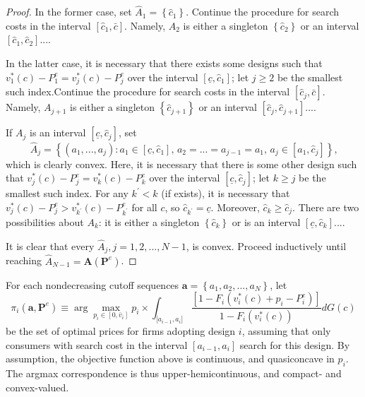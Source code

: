 \documentclass[14pt]{article}
\theoremstyle{plain}
\theoremstyle{definition}
\theoremstyle{remark}
\DeclareRobustCommand\1{\futurelet\oneNext\oneCheck}
\begin{document}
\begin{proof}
In the former case, set $\hat{A}_{1}=\left\{ \hat{c}_{1}\right\} $. Continue
the procedure for search costs in the interval $\left[ \hat{c}_{1},\bar{c}%
\right] $. Namely, $A_{2}$ is either a singleton $\left\{ \hat{c}%
_{2}\right\} $ or an interval $\left[ \hat{c}_{1},\hat{c}_{2}\right] $....

In the latter case, it is necessary that there exists some designs such
that $v_{1}^{\ast }\left( c\right) -P_{1}^{e}=v_{j}^{\ast }\left( c\right)
-P_{j}^{e}$ over the interval $\left[ \underline{c},\hat{c}_{1}\right] $;
let $j\geq 2$ be the smallest such index.Continue the procedure for search costs in the
interval $\left[ \hat{c}_{j},\bar{c}\right] $. Namely, $A_{j+1}$ is either a
singleton $\left\{ \hat{c}_{j+1}\right\} $ or an interval $\left[ \hat{c}%
_{j},\hat{c}_{j+1}\right] $....

If $A_{j}$ is an interval $\left[ \underline{c},\hat{c}_{j}\right] $, set  
\begin{equation*}
\hat{A}_{j}=\left\{ \left( a_{1},...,a_{j}\right) :a_{1}\in \left[ 
\underline{c},\hat{c}_{1}\right] \text{, }a_{2}=...=a_{j-1}=a_{1}\text{, }%
a_{j}\in \left[ a_{1},\hat{c}_{j}\right] \right\} \text{,}
\end{equation*}%
which is clearly convex. Here, it is necessary that there is some other
design such that $v_{j}^{\ast }\left( c\right) -P_{j}^{e}=v_{k}^{\ast
}\left( c\right) -P_{k}^{e}$ over the interval $\left[ \underline{c},\hat{c}%
_{j}\right] $; let $k\geq j$ be the smallest such index. For any $k^{\prime
}<k$ (if exists), it is necessary that $v_{j}^{\ast }\left( c\right)
-P_{j}^{e}>v_{k^{\prime }}^{\ast }\left( c\right) -P_{k^{\prime }}^{e}$ for
all $c$, so $\hat{c}_{k^{\prime }}=\underline{c}$. Moreover, $\hat{c}%
_{k}\geq \hat{c}_{j}$. There are two possibilities about $A_{k}$: it is
either a singleton $\left\{ \hat{c}_{k}\right\} $ or is an interval $\left[ 
\underline{c},\hat{c}_{k}\right] $....

It is clear that every $\hat{A}_{j},j=1,2,...,N-1$, is convex. Proceed
inductively until reaching $\hat{A}_{N-1}=\mathbf{A}\left( \mathbf{P}%
^{e}\right) $.

\end{proof}

\noindent For each nondecreasing cutoff sequences $\mathbf{a}=\left\{
a_{1},a_{2},...,a_{N}\right\} $, let%
\begin{equation*}
\pi _{i}\left( \mathbf{a,P}^{e}\right) \equiv \arg \max_{p_{i}\in \left[ 0,%
\bar{v}_{i}\right] }p_{i}\times \int_{\lbrack a_{i-1},a_{i}]}\frac{\left[
1-F_{i}\left( v_{i}^{\ast }\left( c\right) +p_{i}-P_{i}^{e}\right)\right]}{1-F_i(v_i^*(c))}
dG\left( c\right)
\end{equation*}%
be the set of optimal prices for firms adopting design $i$, assuming that
only consumers with search cost in the interval $[a_{i-1},a_{i}]$ search for
this design. By assumption, the objective function above is continuous, and
quasiconcave in $p_{i}$. The argmax correspondence is thus upper-hemicontinuous, and compact- and convex-valued.
\end{document}

